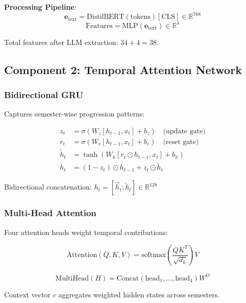 \documentclass[journal]{IEEEtran}
\begin{document}
\textbf{Processing Pipeline}:
\begin{equation}
\mathbf{e}_\text{text} = \text{DistilBERT}(\text{tokens})[\text{CLS}] \in \mathbb{R}^{768}
\end{equation}
\begin{equation}
\text{Features} = \text{MLP}(\mathbf{e}_\text{text}) \in \mathbb{R}^4
\end{equation}

Total features after LLM extraction: $34 + 4 = 38$.

\subsection{Component 2: Temporal Attention Network}

\subsubsection{Bidirectional GRU}

Captures semester-wise progression patterns:

\begin{align}
z_t &= \sigma(W_z [h_{t-1}, x_t] + b_z) \quad \text{(update gate)}\\
r_t &= \sigma(W_r [h_{t-1}, x_t] + b_r) \quad \text{(reset gate)}\\
\tilde{h}_t &= \tanh(W_h [r_t \odot h_{t-1}, x_t] + b_h)\\
h_t &= (1 - z_t) \odot h_{t-1} + z_t \odot \tilde{h}_t
\end{align}

Bidirectional concatenation: $h_t = [\overrightarrow{h}_t; \overleftarrow{h}_t] \in \mathbb{R}^{128}$

\subsubsection{Multi-Head Attention}

Four attention heads weight temporal contributions:

\begin{equation}
\text{Attention}(Q, K, V) = \text{softmax}\left(\frac{QK^T}{\sqrt{d_k}}\right)V
\end{equation}

\begin{equation}
\text{MultiHead}(H) = \text{Concat}(\text{head}_1, ..., \text{head}_4)W^O
\end{equation}

Context vector $c$ aggregates weighted hidden states across semesters.
\end{document}
